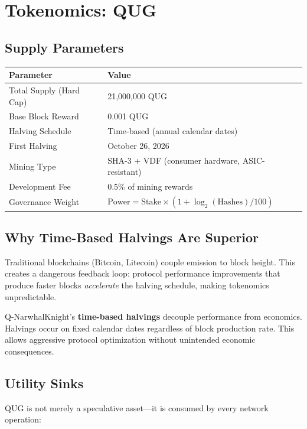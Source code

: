 \documentclass[11pt,a4paper]{article}
\begin{document}
\section{Tokenomics: QUG}

\subsection{Supply Parameters}

\begin{center}
\begin{tabular}{@{}ll@{}}
\toprule
\textbf{Parameter} & \textbf{Value} \\
\midrule
Total Supply (Hard Cap) & 21,000,000 QUG \\
Base Block Reward & 0.001 QUG \\
Halving Schedule & Time-based (annual calendar dates) \\
First Halving & October 26, 2026 \\
Mining Type & SHA-3 + VDF (consumer hardware, ASIC-resistant) \\
Development Fee & 0.5\% of mining rewards \\
Governance Weight & $\text{Power} = \text{Stake} \times (1 + \log_2(\text{Hashes}) / 100)$ \\
\bottomrule
\end{tabular}
\end{center}

\subsection{Why Time-Based Halvings Are Superior}

Traditional blockchains (Bitcoin, Litecoin) couple emission to block height. This creates a dangerous feedback loop: protocol performance improvements that produce faster blocks \textit{accelerate} the halving schedule, making tokenomics unpredictable.

Q-NarwhalKnight's \textbf{time-based halvings} decouple performance from economics. Halvings occur on fixed calendar dates regardless of block production rate. This allows aggressive protocol optimization without unintended economic consequences.

\subsection{Utility Sinks}

QUG is not merely a speculative asset---it is consumed by every network operation:
\end{document}
